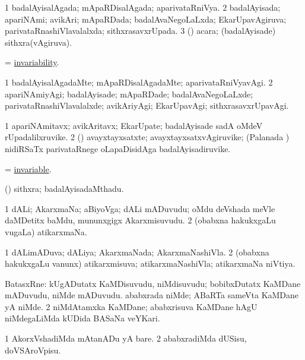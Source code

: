 \bentry
{}
\gl{\gu}
\bmng
\bnum
\num{1} badalAyisalAgada; mApaRDisalAgada; aparivataRniVya. 
\num{2} badalAyisada; apariNAmi; avikAri; mApaRDada; badalAvaNegoLaLxda; EkarUpavAgiruva; parivataRnashiVlavalalxda; sithxrasavxrUpada. 
\num{3} (\ga) acara; (badalAyisade) sithxra(vAgiruva). 
\enum
\emng
\eentry

\bentry
{}
\gl{\nA}
\bmng
=  \hyperlink{invariability}{invariability}. 
\emng
\eentry

\bentry
{}
\gl{\kirxvi}
\bmng
\bnum
\num{1} badalAyisalAgadaMte; mApaRDisalAgadaMte; aparivataRniVyavAgi. 
\num{2} apariNAmiyAgi; badalAyisade; mApaRDade; badalAvaNegoLaLxde; parivataRnashiVlavalalxde; avikAriyAgi; EkarUpavAgi; sithxrasavxrUpavAgi. 
\enum
\emng
\eentry

\bentry
{}
\gl{\nA}
\bmng
\bnum
\num{1} apariNAmitavx; avikAritavx; EkarUpate; badalAyisade sadA oMdeV rUpadalilxruvike. 
\num{2} (\ga) avayxtayxsatxte; avayxtayxsatxvAgiruvike; (Palanada \vi) nidiRSaTx parivataRnege oLapaDisidAga badalAyisadiruvike. 
\enum
\emng
\eentry

\bentry
{}
\gl{\gu}
\bmng
=  \hyperlink{invariable}{invariable}. 
\emng
\eentry

\bentry
{}
\gl{\nA}
\bmng
(\ga) sithxra; badalAyisadaMthadu. 
\emng
\eentry

\bentry
{}
\gl{\nA}
\bmng
\bnum
\num{1} dALi; AkarxmaNa; aBiyoVga; dALi mADuvudu; oMdu deVshada meVle daMDetitx baMdu, mununxgigx Akarxmisuvudu. 
\num{2} (obabxna hakukxgaLu \mo vugaLa) atikarxmaNa. 
\enum
\emng
\eentry

\bentry
{}
\gl{\gu}
\bmng
\bnum
\num{1} dALimADuva; dALiya; AkarxmaNada; AkarxmaNashiVla. 
\num{2} (obabxna hakukxgaLu \mo vanunx) atikarxmisuva; atikarxmaNashiVla; atikarxmaNa niVtiya. 
\enum
\emng
\eentry

\bentry
{}
\gl{\nA}
\bmng
\bnum
{} BatasxRne: 
\banum
{} kUgADutatx KaMDisuvudu, niMdisuvudu; bobibxDutatx KaMDane mADuvudu, niMde mADuvudu. 
 ababxrada niMde; ABaRTa sameVta KaMDane yA niMde. 
\eanum
\numie
\num{2} niMdAtamxka KaMDane; ababxrisuva KaMDane hAgU niMdegaLiMda kUDida BASaNa veYKari. 
\enum
\emng
\eentry

\bentry
{}
\gl{\akirx}
\bmng
\bnum
\num{1} AkorxVshadiMda mAtanADu yA bare. 
\num{2} ababxradiMda dUSisu, doVSAroVpisu. 
\enum
\emng
\eentry

